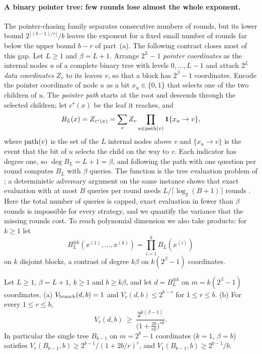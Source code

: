 \paragraph{A binary pointer tree: few rounds lose almost the whole exponent.}
The pointer-chasing family separates consecutive numbers of rounds, but its
lower bound $2^{\lfloor(b-1)/r\rfloor}/b$ leaves the exponent for a fixed
small number of rounds far below the upper bound $b-r$ of part~(a). The
following contrast closes most of this gap. Let $L\ge1$ and $\beta=L+1$.
Arrange $2^L-1$ \emph{pointer coordinates} as the internal nodes $u$ of a
complete binary tree with levels $0,\ldots,L-1$ and attach $2^L$ \emph{data
coordinates} $Z_v$ to its leaves $v$, so that a block has $2^{\beta}-1$
coordinates. Encode the pointer coordinate of node $u$ as a bit
$x_u\in\{0,1\}$ that selects one of the two children of $u$. The
\emph{pointer path} starts at the root and descends through the selected
children; let $c^\star(x)$ be the leaf it reaches, and
\[
 B_L(x)=Z_{c^\star(x)}=\sum_{v}Z_v\prod_{u\in{\rm path}(v)}\mathbf 1\{x_u\to v\},
\]
where ${\rm path}(v)$ is the set of the $L$ internal nodes above $v$ and
$\{x_u\to v\}$ is the event that the bit of $u$ selects the child on the way
to $v$. Each indicator has degree one, so $\deg B_L=L+1=\beta$, and following
the path with one question per round computes $B_L$ with $\beta$ queries. The
function is the tree evaluation problem of \citet{cook2012}; a deterministic
adversary argument on the same instance shows that exact evaluation with at
most $B$ queries per round needs $L/\lceil\log_2(B+1)\rceil$ rounds
\citep{li2026regex}. Here the total number of queries is capped, exact
evaluation in fewer than $\beta$ rounds is impossible for every strategy, and
we quantify the variance that the missing rounds cost. To reach polynomial
dimension we also take products: for $k\ge1$ let
\[
 B_L^{\otimes k}(x^{(1)},\ldots,x^{(k)})=\prod_{i=1}^kB_L(x^{(i)})
\]
on $k$ disjoint blocks, a contrast of degree $k\beta$ on $k(2^\beta-1)$
coordinates.

\begin{theorem}\label{thm:binarytree}
Let $L\ge1$, $\beta=L+1$, $k\ge1$ and $b\ge k\beta$, and let
$d=B_L^{\otimes k}$ on $m=k(2^\beta-1)$ coordinates.
\textup{(a)} $V_{\rm branch}(d,b)=1$ and $V_r(d,b)\le2^{b-r}$ for
$1\le r\le b$.
\textup{(b)} For every $1\le r\le b$,
\[
 V_r(d,b)\ \ge\ \frac{2^{k(\beta-1)}}{\big(1+\tfrac{2b}{rk}\big)^{rk}} .
\]
In particular the single tree $B_{b-1}$ on $m=2^b-1$ coordinates ($k=1$,
$\beta=b$) satisfies $V_r(B_{b-1},b)\ge2^{b-1}/(1+2b/r)^r$, and
$V_1(B_{b-1},b)\ge2^{b-1}/b$.
\end{theorem}

